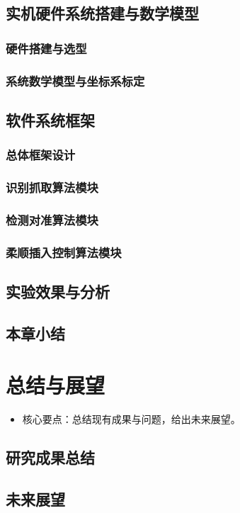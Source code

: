 \documentclass{Diploma}
\begin{document}
\begin{}
\section{实机硬件系统搭建与数学模型}
\subsection{硬件搭建与选型}
\subsection{系统数学模型与坐标系标定}
\section{软件系统框架}
\subsection{总体框架设计}
\subsection{识别抓取算法模块}
\subsection{检测对准算法模块}
\subsection{柔顺插入控制算法模块}
\section{实验效果与分析}
\section{本章小结}

\chapter{总结与展望}
\begin{itemize}
  \item 核心要点：总结现有成果与问题，给出未来展望。
\end{itemize}
\section{研究成果总结}
\section{未来展望}


\end{}
\end{document}
